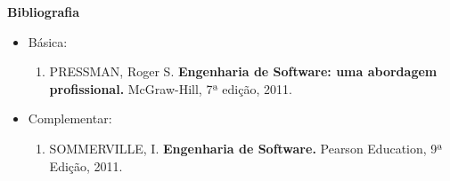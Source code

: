 

\begin{snugshade}\begin{center}\textbf{
    Bibliografia
}\end{center}\end{snugshade}

\begin{itemize} 
  \item Básica:
	\begin{enumerate}
	\item PRESSMAN, Roger S. \textbf{Engenharia de Software: uma abordagem profissional.} McGraw-Hill,  7ª edição, 2011.    
	\end{enumerate}
  \item Complementar:
	\begin{enumerate} 
	\item  SOMMERVILLE, I. \textbf{Engenharia de Software.} Pearson
	Education, 9ª Edição, 2011.
	\end{enumerate}
\end{itemize}
